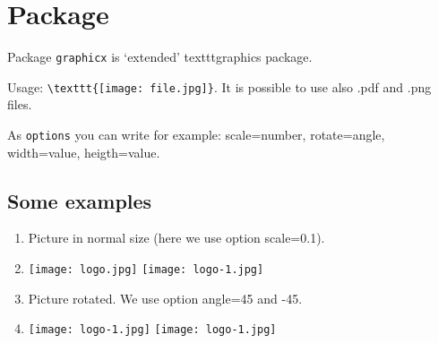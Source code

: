 \documentclass{article}
\begin{document}
\newpage

\section*{Package }

Package \verb|graphicx| is ‘extended’ textttgraphics package.

Usage: \verb|\texttt{[image: file.jpg]}|. It is possible to use also
.pdf and .png files.

As \verb|options| you can write for example: scale=number, rotate=angle, width=value,
heigth=value.

\subsection*{Some examples}


\begin{enumerate}
  \item Picture in normal size (here we use option scale=0.1).
  \item[] \texttt{[image: logo.jpg]} \hspace{2mm} \texttt{[image: logo-1.jpg]}
  \item Picture rotated. We use option angle=45 and -45.
  \item[] \texttt{[image: logo-1.jpg]} \hspace{2mm} \texttt{[image: logo-1.jpg]}
\end{enumerate}
\end{document}
